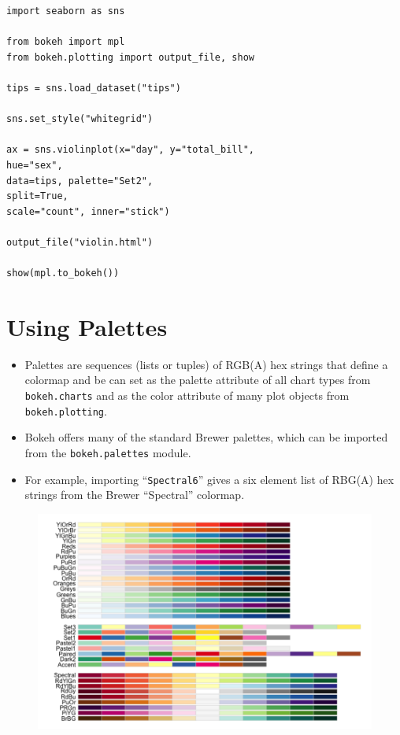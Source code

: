 \documentclass[a4paper,12pt]{article}
\begin{document}
\begin{verbatim}
import seaborn as sns

from bokeh import mpl
from bokeh.plotting import output_file, show

tips = sns.load_dataset("tips")

sns.set_style("whitegrid")

ax = sns.violinplot(x="day", y="total_bill", 
hue="sex",
data=tips, palette="Set2", 
split=True,
scale="count", inner="stick")

output_file("violin.html")

show(mpl.to_bokeh())

\end{verbatim}
\newpage

\section*{Using Palettes}
\begin{itemize}
	\item Palettes are sequences (lists or tuples) of RGB(A) hex strings that define a colormap and be can set as the palette attribute of all chart types from \texttt{bokeh.charts} and as the color attribute of many plot objects from \texttt{bokeh.plotting}. 
	\item Bokeh offers many of the standard Brewer palettes, which can be imported from the \texttt{bokeh.palettes} module. 
	\item For example, importing “\texttt{Spectral6}” gives a six element list of RBG(A) hex strings from the Brewer “Spectral” colormap.
\end{itemize}

\begin{figure}[h!]
	\centering
	\includegraphics[width=1.2\linewidth]{images/04-pallettes-brewer}
	
\end{figure}
\end{document}
